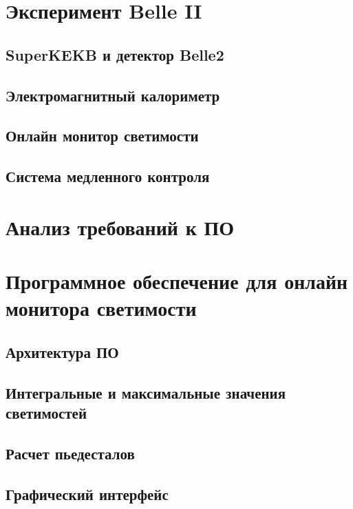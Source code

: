 \documentclass[a4paper, 12pt]{article}
\begin{document}
\section{Эксперимент Belle II}
    \subsection{SuperKEKB и детектор Belle2}
    
    \subsection{Электромагнитный калориметр}
    
    \subsection{Онлайн монитор светимости}
    
    \subsection{Система медленного контроля}
    
    

\section{Анализ требований к ПО}
    

\section{Программное обеспечение для онлайн монитора светимости}
    \subsection{Архитектура ПО}
    
    \subsection{Интегральные и максимальные значения светимостей}
    
    \subsection{Расчет пьедесталов}
    
    \subsection{Графический интерфейс}
    
\end{document}
